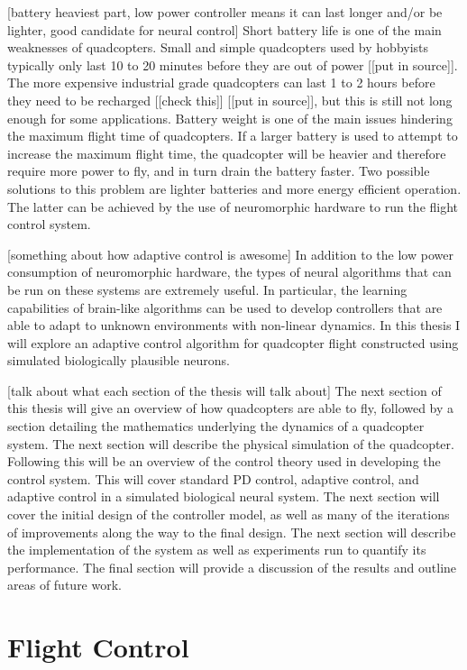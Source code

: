 \documentclass[letterpaper,12pt,titlepage,oneside,final]{book}
\begin{document}
[battery heaviest part, low power controller means it can last longer and/or be lighter, good candidate for neural control]
Short battery life is one of the main weaknesses of quadcopters. Small and simple quadcopters used by hobbyists typically only last 10 to 20 minutes before they are out of power [[put in source]]. The more expensive industrial grade quadcopters can last 1 to 2 hours before they need to be recharged [[check this]] [[put in source]], but this is still not long enough for some applications. Battery weight is one of the main issues hindering the maximum flight time of quadcopters. If a larger battery is used to attempt to increase the maximum flight time, the quadcopter will be heavier and therefore require more power to fly, and in turn drain the battery faster. Two possible solutions to this problem are lighter batteries and more energy efficient operation. The latter can be achieved by the use of neuromorphic hardware to run the flight control system.

[something about how adaptive control is awesome]
In addition to the low power consumption of neuromorphic hardware, the types of neural algorithms that can be run on these systems are extremely useful. In particular, the learning capabilities of brain-like algorithms can be used to develop controllers that are able to adapt to unknown environments with non-linear dynamics. In this thesis I will explore an adaptive control algorithm for quadcopter flight constructed using simulated biologically plausible neurons.

[talk about what each section of the thesis will talk about]
The next section of this thesis will give an overview of how quadcopters are able to fly, followed by a section detailing the mathematics underlying the dynamics of a quadcopter system. The next section will describe the physical simulation of the quadcopter. Following this will be an overview of the control theory used in developing the control system. This will cover standard PD control, adaptive control, and adaptive control in a simulated biological neural system. The next section will cover the initial design of the controller model, as well as many of the iterations of improvements along the way to the final design. The next section will describe the implementation of the system as well as experiments run to quantify its performance. The final section will provide a discussion of the results and outline areas of future work.

\section{Flight Control}
\end{document}
